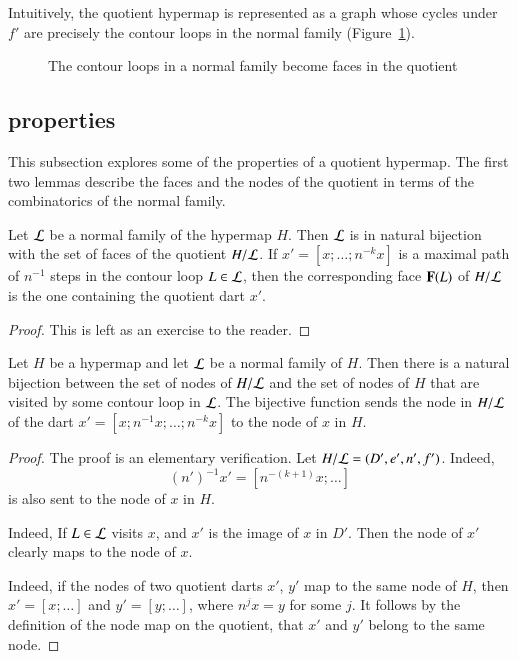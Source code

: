 Intuitively, the quotient hypermap is represented as a graph whose
cycles under $f'$ are precisely the contour loops in the normal family
(Figure~\ref{fig:quot}).


\begin{figure}[htb]
\centering
{}
\caption{The contour loops in a normal family become faces in the
quotient}
\label{fig:quot}
\end{figure}

\subsection{properties}

This subsection explores some of the properties of a quotient hypermap.
The first two lemmas describe the faces and the nodes of the quotient
in terms of the combinatorics of the normal family.

\begin{lemma}\label{lemma:quotient-bijection}
  Let ${\cal L}$ be a normal family of the hypermap $H$.  Then ${\cal
    L}$ is in natural bijection with the set of faces of the quotient
  $H/{\cal L}$.  If $x'=[x;\ldots;n^{-k}x]$ is a maximal path of
  $n^{-1}$ steps in the contour loop $L\in{\cal L}$, then the
  corresponding face ${\mathbf F}(L)$ of $H/{\cal L}$ is the
  one containing the quotient dart $x'$.
\end{lemma}

\begin{proof}  This is left as an exercise to the reader.
\end{proof}


\begin{lemma}\label{lemma:quotient-node}
Let $H$ be a hypermap and let ${\cal L}$ be a normal family of $H$.
Then there is a natural bijection between  the set of nodes of
$H/{\cal L}$ and the set of nodes of $H$ that
are visited by some contour loop in ${\cal L}$.   
The bijective function sends the node in $H/{\cal L}$ of 
the dart $x' = [x;n^{-1} x;\ldots;n^{-k}x]$ to the node of $x$ in $H$.
\end{lemma}

\begin{proof}  The proof is an elementary verification.
Let $H/{\cal L} = (D',e',n',f')$.
  Indeed, 
 \begin{displaymath}
(n')^{-1} x' = [n^{-(k+1)} x;\ldots]
\end{displaymath}
 is also sent to the node of $x$ in $H$.

  Indeed,
If $L\in {\cal L}$ visits $x$,  and $x'$ is the image of $x$ in $D'$.
Then the node of $x'$ clearly maps to the node of $x$.  

  Indeed, if the nodes of
two quotient darts $x'$, $y'$ map to the same node of $H$, then
$x'=[x;\ldots]$ and $y'=[y;\ldots]$, where $n^j x = y$ for some $j$.
It follows by the definition of the node map on the quotient, that
$x'$ and $y'$ belong to the same node.
\end{proof}

